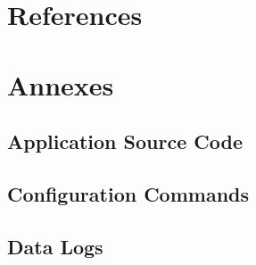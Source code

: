 \documentclass[11pt]{article}
\begin{document}
\section*{References}

\section*{Annexes}

\subsection*{Application Source Code}

\subsection*{Configuration Commands}

\subsection*{Data Logs}
\end{document}
